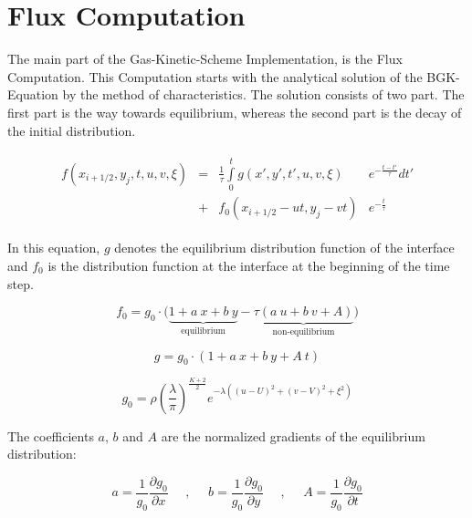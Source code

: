 \documentclass[
	pdftex,             %
	12pt,				%
	a4paper,		   	%
	english,				%
	oneside,			%
]{article}
\begin{document}
\section{Flux Computation}

The main part of the Gas-Kinetic-Scheme Implementation, is the Flux Computation. This Computation starts with the analytical solution of the BGK-Equation by the method of characteristics. The solution consists of two part. The first part is the way towards equilibrium, whereas the second part is the decay of the initial distribution. 

\begin{equation}
\begin{split}
\begin{array}{lcll}
f(x_{i+1/2}, y_j, t,u,v,\xi) 
&=&
 \frac{1}{\tau} \int \limits_0^t
g(x', y', t', u, v, \xi) &e^{-\tfrac{t-t'}{\tau}} dt'
\\
&+& f_0(x_{i+1/2} - ut, y_j - vt) &e^{-\tfrac{t}{\tau}}
\end{array}
\end{split}
\end{equation}

In this equation, $g$ denotes the equilibrium distribution function of the interface and $f_0$ is the distribution function at the interface at the beginning of the time step. 

\begin{equation}
f_0 = g_0 \cdot
\Big( 
\underbrace{ 1 + a~x + b~y }_{\text{equilibrium}}
-
\underbrace{ \tau \left( a~u + b~v + A \right) }_{\text{non-equilibrium}}
\Big)
\end{equation}

\begin{equation}
g = g_0 \cdot \left( 1 + a~x + b~y + A~t \right)
\end{equation}

\begin{equation}
g_0 = \rho \left( \frac{\lambda}{\pi} \right)^{\frac{K+2}{2}}
           e^{-\lambda ((u-U)^2 + (v-V)^2 + \xi^2)}
\end{equation}

The coefficients $a$, $b$ and $A$ are the normalized gradients of the equilibrium distribution:

\begin{equation}
a = \frac{1}{g_0} \frac{\partial g_0}{\partial x} ~~~~~~,~~~~~~
b = \frac{1}{g_0} \frac{\partial g_0}{\partial y} ~~~~~~,~~~~~~
A = \frac{1}{g_0} \frac{\partial g_0}{\partial t}
\end{equation}
\end{document}
